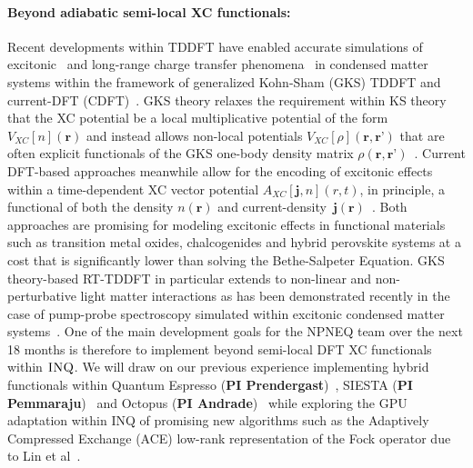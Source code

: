 \paragraph{Beyond adiabatic semi-local XC functionals:}  Recent developments within TDDFT have enabled accurate simulations of excitonic~\cite{Ullrich2014b, Refaely-Abramson2015a, Pemmaraju2018b} and long-range charge transfer phenomena~\cite{Kummel2017} in condensed matter systems within the framework of generalized Kohn-Sham (GKS) TDDFT and current-DFT (CDFT)~\cite{Sun2021}.  GKS theory relaxes the requirement within KS theory that the XC potential be a local multiplicative potential of the form $V_{XC}[n](\textbf{r})$ and instead allows non-local potentials $V_{XC}[\rho](\textbf{r},\textbf{r'} )$ that are often explicit functionals of the GKS one-body density matrix $\rho(\textbf{r},\textbf{r'})$~\cite{Baer2018}. Current DFT-based approaches meanwhile allow for the  encoding of excitonic effects within a time-dependent XC vector potential $A_{XC}[\textbf{j},n](r,t)$, in principle, a functional of both the density $n(\textbf{r})$ and current-density~$\textbf{j}(\textbf{r})$~\cite{Sun2021}. Both approaches are promising for  modeling excitonic effects in  functional materials such as transition metal oxides, chalcogenides and hybrid perovskite systems at a cost that is significantly lower than solving the Bethe-Salpeter Equation. GKS theory-based RT-TDDFT in particular extends to non-linear and non-perturbative light matter interactions as has been demonstrated recently in the case of pump-probe spectroscopy simulated within excitonic condensed matter systems~\cite{Pemmaraju2020}. One of the main development goals for the NPNEQ team over the next 18 months is therefore to implement beyond semi-local DFT XC functionals within $\textsc{INQ}$.  We will draw on our previous experience implementing hybrid functionals within Quantum Espresso (\textbf{PI Prendergast})~\cite{Barnes2017}, SIESTA (\textbf{PI Pemmaraju})~\cite{Pemmaraju2018b} and Octopus (\textbf{PI Andrade})~\cite{Andrade2015} while exploring the GPU adaptation within \textsc{INQ} of promising new algorithms such as the  Adaptively Compressed Exchange (ACE) low-rank representation of the Fock operator due to Lin et al~\cite{Lin2016}.   

